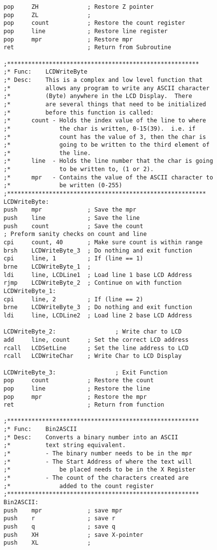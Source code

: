 \documentclass[12pt,letterpaper]{article}
\begin{document}
\begin{verbatim}
	    pop		ZH				; Restore Z pointer
	    pop		ZL				;
	    pop		count			; Restore the count register
	    pop		line			; Restore line register
	    pop		mpr				; Restore mpr
	    ret						; Return from Subroutine
	    
	    ;*******************************************************
	    ;* Func:	LCDWriteByte
	    ;* Desc:	This is a complex and low level function that
	    ;*			allows any program to write any ASCII character
	    ;*			(Byte) anywhere in the LCD Display.  There
	    ;*			are several things that need to be initialized
	    ;*			before this function is called:
	    ;*		count - Holds the index value of the line to where
	    ;*				the char is written, 0-15(39).  i.e. if 
	    ;*				count has the value of 3, then the char is
	    ;*				going to be written to the third element of
	    ;*				the line.
	    ;*		line  - Holds the line number that the char is going
	    ;*				to be written to, (1 or 2).
	    ;*		mpr	  - Contains the value of the ASCII character to 
	    ;*				be written (0-255)
	    ;*********************************************************
	    LCDWriteByte:
	    push	mpr				; Save the mpr
	    push	line			; Save the line
	    push	count			; Save the count
	    ; Preform sanity checks on count and line
	    cpi		count, 40		; Make sure count is within range
	    brsh	LCDWriteByte_3	; Do nothing and exit function
	    cpi		line, 1			; If (line == 1)
	    brne	LCDWriteByte_1	; 
	    ldi		line, LCDLine1	; Load line 1 base LCD Address
	    rjmp	LCDWriteByte_2	; Continue on with function
	    LCDWriteByte_1:					
	    cpi		line, 2			; If (line == 2)
	    brne	LCDWriteByte_3	; Do nothing and exit function
	    ldi		line, LCDLine2	; Load line 2 base LCD Address
	    
	    LCDWriteByte_2:					; Write char to LCD
	    add		line, count		; Set the correct LCD address
	    rcall	LCDSetLine		; Set the line address to LCD
	    rcall	LCDWriteChar	; Write Char to LCD Display		
	    
	    LCDWriteByte_3:					; Exit Function
	    pop		count			; Restore the count
	    pop		line			; Restore the line
	    pop		mpr				; Restore the mpr
	    ret						; Return from function
	    
	    ;*******************************************************
	    ;* Func:	Bin2ASCII
	    ;* Desc:	Converts a binary number into an ASCII 
	    ;*			text string equivalent. 
	    ;*			- The binary number needs to be in the mpr
	    ;*			- The Start Address of where the text will
	    ;*			 	be placed needs to be in the X Register
	    ;*			- The count of the characters created are 
	    ;*				added to the count register
	    ;*******************************************************
	    Bin2ASCII:
	    push	mpr				; save mpr
	    push	r				; save r
	    push	q				; save q
	    push	XH				; save X-pointer
	    push	XL				;
	    

\end{verbatim}
\end{document}
